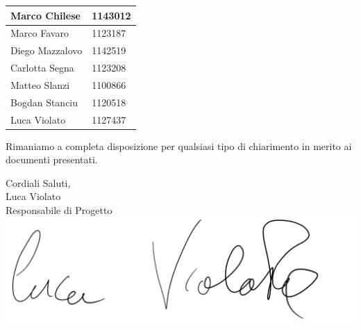 \documentclass[11pt, a4paper]{letter} %
\begin{document}
\begin{letter}
\begin{center}
\begin{longtable}[c]{|m{}|m{}|}
				\hline
				Marco Chilese & 1143012\\
				\hline
				\rowcolor{grigio}Marco Favaro & 1123187\\ 
				\hline
				Diego Mazzalovo & 1142519\\
				\hline
				\rowcolor{grigio}Carlotta Segna & 1123208\\
				\hline
				Matteo Slanzi & 1100866\\
				\hline
				\rowcolor{grigio}Bogdan Stanciu  & 1120518\\
				\hline
				Luca Violato & 1127437\\
				\hline
			\end{longtable}
		\end{center}
		
		Rimaniamo a completa disposizione per qualsiasi tipo di chiarimento in merito ai documenti presentati.
		
		\closing{Cordiali Saluti,\\
			Luca Violato\\
			Responsabile di Progetto
			\includegraphics[scale=0.2]{images/LucaViolato.png}}
		
		
		
		
	\end{letter}
	
\end{document}
